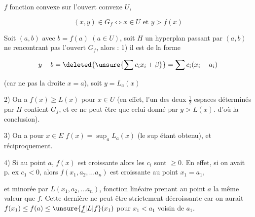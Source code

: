 
$f$ fonction convexe sur l'ouvert convexe $U$,

\[
(x,y)\in G_f\iff x\in U\text{ et } y>f(x)
\]

Soit  $(a,b)$ avec $b=f(a)$ $(a\in U)$,  soit $H$ un hyperplan passant par $(a,b)$ ne rencontrant pas l'ouvert $G_f$, alors : 1) il est de la forme

\[
y-b=\deleted{\unsure{\sum c_i x_i+\beta}}=\sum c_i(x_i-a_i)
\]

(car ne  pas la droite $x=a$), soit $y=L_a(x)$

2) On a $f(x)\geq L(x)$ pour \uline{} $x\in U$ (en effet, l'un des deux  $\frac12$ espaces  déterminés par $H$ contient $G_f$, et ce ne peut être que celui donné par $y>L(x)$.  d'où la conclusion).

3) On a pour $x\in E$ $f(x)=\sup_a L_a(x)$ (le sup étant obtenu), et réciproquement.

4) Si au point $a$, $f(x)$ est croissante alors les $c_i$ sont $\geq0$. En effet, si on avait p. ex $c_1<0$, alors $f(x_1,a_2,\ldots a_n)$ est croissante au point $x_1=a_1$,


et  minorée par $L(x_1,a_2,\ldots a_n)$, fonction linéaire prenant au point $a$ la même valeur que $f$. Cette dernière ne peut être strictement décroissante car on aurait $f(x_1)\leq f(a)\leq\unsure{\underline{f}|L|f}(x_1)$ pour $x_1<a_1$ voisin de $a_1$.


